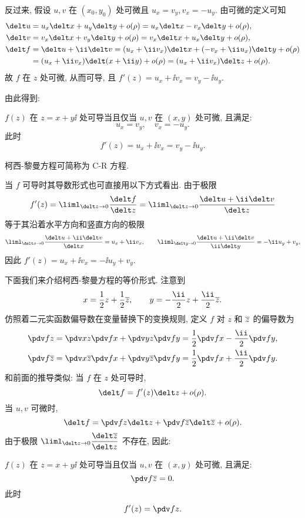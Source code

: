 反过来, 假设 $u,v$ 在 $(x_0,y_0)$ 处可微且 $u_x=v_y, v_x=-u_y$.
由可微的定义可知
\begin{align*}
  \delt u&=u_x\delt x+u_y\delt y+o(\rho)
    =u_x\delt x-v_x\delt y+o(\rho),\\
  \delt v&=v_x\delt x+v_y\delt y+o(\rho)
    =v_x\delt x+u_x\delt y+o(\rho),\\
  \delt f&=\delt u+\ii\delt v
    =(u_x+\ii v_x)\delt x+(-v_x+\ii u_x)\delt y+o(\rho)\\
   &=(u_x+\ii v_x)\delt (x+\ii y)+o(\rho)
    =(u_x+\ii v_x)\delt z+o(\rho).
\end{align*}
故 $f$ 在 $z$ 处可微, 从而可导, 且 $f'(z)=u_x+\ii v_x=v_y-\ii u_y$.

由此得到:

\begin{theorem}[柯西-黎曼定理]
  \label{thm:Cauchy-Riemann}
  $f(z)$ 在 $z=x+y\ii$ 处可导当且仅当 $u,v$ 在 $(x,y)$ 处可微, 且满足:
  \[
    u_x=v_y,\quad v_x=-u_y.
  \]
  此时
  \[
    f'(z)=u_x+\ii v_x=v_y-\ii u_y.
  \]
\end{theorem}

柯西-黎曼方程可简称为 C-R 方程.

当 $f$ 可导时其导数形式也可直接用以下方式看出.
由于极限
\[
   f'(z)
  =\liml_{\delt z\ra 0}\frac{\delt f}{\delt z}
  =\liml_{\delt z\ra 0}\frac{\delt u+\ii\delt v}{\delt z}
\]
等于其沿着水平方向和竖直方向的极限
\[
  \liml_{\delt x\ra 0}\frac{\delt u+\ii\delt v}{\delt x}=u_x+\ii v_x,\qquad
  \liml_{\delt y\ra 0}\frac{\delt u+\ii\delt v}{\ii\delt y}=-\ii u_y+v_y,
\]
因此 $f'(z)=u_x+\ii v_x=-\ii u_y+v_y$.

下面我们来介绍柯西-黎曼方程的等价形式.
注意到
\[
  x=\frac12z+\frac12\ov z,\qquad
  y=-\frac \ii2z+\frac \ii2\ov z.
\]
仿照着二元实函数偏导数在变量替换下的变换规则, 定义 $f$ 对 $z$ 和 $\overline z$ 的偏导数为
\begin{align*}
   \pdv fz&
  =\pdv xz\pdv fx+\pdv yz\pdv fy
  =\frac12\pdv fx-\frac \ii2\pdv fy,\\
   \pdv f{\ov z}&
  =\pdv x{\ov z}\pdv fx+\pdv y{\ov z}\pdv fy
  =\frac12\pdv fx+\frac \ii2\pdv fy.
\end{align*}
和前面的推导类似: 当 $f$ 在 $z$ 处可导时,
\[
  \delt f=f'(z)\delt z+o(\rho).
\]
当 $u,v$ 可微时,
\[
  \delt f=\pdv fz\delt z+\pdv f{\ov z}\delt \ov z+o(\rho).
\]
由于极限 $\liml_{\delt z\ra 0}\dfrac{\delt \ov z}{\delt z}$ 不存在, 因此:

\begin{theorem}[柯西-黎曼定理的等价形式]
  $f(z)$ 在 $z=x+y\ii$ 处可导当且仅当 $u,v$ 在 $(x,y)$ 处可微, 且满足:
  \[
    \pdv f{\ov z}=0.
  \]
  此时
  \[
    f'(z)=\pdv fz.
  \]
\end{theorem}

